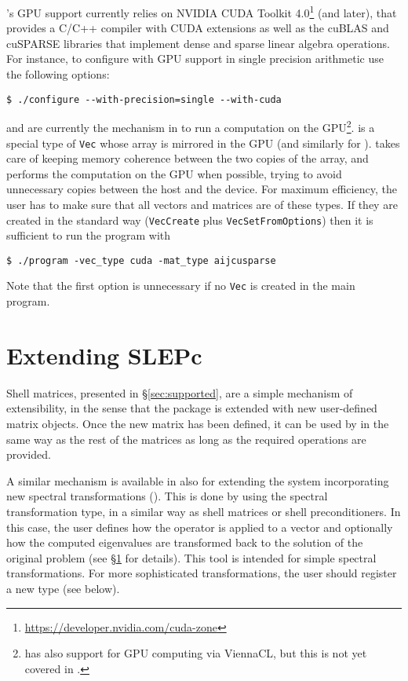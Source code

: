 \slepc's GPU support currently relies on NVIDIA CUDA Toolkit 4.0\footnote{\url{https://developer.nvidia.com/cuda-zone}} (and later), that provides a C/C++ compiler with CUDA extensions as well as the cuBLAS and cuSPARSE libraries that implement dense and sparse linear algebra operations. For instance, to configure \petsc with GPU support in single precision arithmetic use the following options:
	\begin{Verbatim}[fontsize=\small]
	$ ./configure --with-precision=single --with-cuda
	\end{Verbatim}

 and  are currently the mechanism in \petsc to run a computation on the GPU\footnote{\petsc has also support for GPU computing via ViennaCL, but this is not yet covered in \slepc.}.  is a special type of \texttt{Vec} whose array is mirrored in the GPU (and similarly for ). \petsc takes care of keeping memory coherence between the two copies of the array, and performs the computation on the GPU when possible, trying to avoid unnecessary copies between the host and the device. For maximum efficiency, the user has to make sure that all vectors and matrices are of these types. If they are created in the standard way (\texttt{VecCreate} plus \texttt{VecSetFromOptions}) then it is sufficient to run the \slepc program with
	\begin{Verbatim}[fontsize=\small]
	$ ./program -vec_type cuda -mat_type aijcusparse
	\end{Verbatim}
Note that the first option is unnecessary if no \texttt{Vec} is created in the main program.

\section{Extending SLEPc}
\label{sec:shell}

	Shell matrices, presented in \S\ref{sec:supported}, are a simple mechanism of extensibility, in the sense that the package is extended with new user-defined matrix objects. Once the new matrix has been defined, it can be used by \slepc in the same way as the rest of the matrices as long as the required operations are provided.

	A similar mechanism is available in \slepc also for extending the system incorporating new spectral transformations (). This is done by using the  spectral transformation type, in a similar way as shell matrices or shell preconditioners. In this case, the user defines how the operator is applied to a vector and optionally how the computed eigenvalues are transformed back to the solution of the original problem (see \S\ref{sec:shell} for details). This tool is intended for simple spectral transformations. For more sophisticated transformations, the user should register a new  type (see below).

